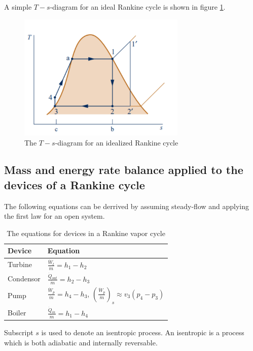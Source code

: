 \documentclass[11pt, a4paper]{article}
\begin{document}
A simple $T-s$-diagram for an ideal Rankine cycle is shown in figure \ref{fig:RankineCycle}.
\begin{figure}[h]
  \centerline{\includegraphics[width=80mm]{images/RankineCycle.png}}
  \caption{The $T-s$-diagram for an idealized Rankine cycle}
  \label{fig:RankineCycle}
\end{figure}


\subsection{Mass and energy rate balance applied to the devices of a Rankine cycle}
The following equations can be derrived by assuming steady-flow and applying the first law for an open system.
\begin{table}[h]
  \caption{The equations for devices in a Rankine vapor cycle} %
  \centering %
  \begin{tabular}{l|l} %
    \hline\hline %
    Device & Equation\\ [0.5ex] %
    \hline \hline
    Turbine & $\frac{\dot{W}_t}{\dot{m}} = h_1 - h_2$ \\ 
    Condensor &  $\frac{\dot{Q}_{out}}{\dot{m}} = h_2 - h_3$\\
    Pump &  $\frac{\dot{W}_p}{\dot{m}} = h_4 - h_3$, $\left( \frac{\dot{W}_p}{\dot{m}} \right)_s \approx v_3(p_4 - p_3)$\\
    Boiler & $\frac{\dot{Q}_{in}}{\dot{m}} = h_1 - h_4$ \\
  \hline %
  \end{tabular}
  \label{tab:hresult}
\end{table}
Subscript $s$ is used to denote an isentropic process. An isentropic is a process which is both adiabatic and internally reversable.
\end{document}
